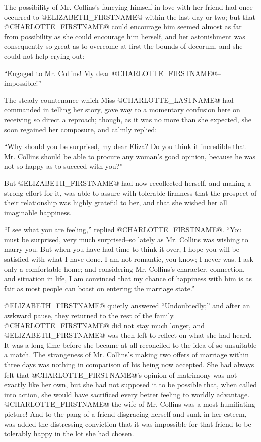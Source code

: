 The possibility of Mr. Collins's fancying himself in love with her
friend had once occurred to @ELIZABETH_FIRSTNAME@ within the last day or two; but
that @CHARLOTTE_FIRSTNAME@ could encourage him seemed almost as far from
possibility as she could encourage him herself, and her astonishment was
consequently so great as to overcome at first the bounds of decorum, and
she could not help crying out:

``Engaged to Mr. Collins! My dear @CHARLOTTE_FIRSTNAME@--impossible!''

The steady countenance which Miss @CHARLOTTE_LASTNAME@ had commanded in telling her
story, gave way to a momentary confusion here on receiving so direct a
reproach; though, as it was no more than she expected, she soon regained
her composure, and calmly replied:

``Why should you be surprised, my dear Eliza? Do you think it incredible
that Mr. Collins should be able to procure any woman's good opinion,
because he was not so happy as to succeed with you?''

But @ELIZABETH_FIRSTNAME@ had now recollected herself, and making a strong effort
for it, was able to assure with tolerable firmness that the prospect of
their relationship was highly grateful to her, and that she wished her
all imaginable happiness.

``I see what you are feeling,'' replied @CHARLOTTE_FIRSTNAME@. ``You must be surprised,
very much surprised--so lately as Mr. Collins was wishing to marry
you. But when you have had time to think it over, I hope you will be
satisfied with what I have done. I am not romantic, you know; I never
was. I ask only a comfortable home; and considering Mr. Collins's
character, connection, and situation in life, I am convinced that my
chance of happiness with him is as fair as most people can boast on
entering the marriage state.''

@ELIZABETH_FIRSTNAME@ quietly answered ``Undoubtedly;'' and after an awkward pause,
they returned to the rest of the family. @CHARLOTTE_FIRSTNAME@ did not stay much
longer, and @ELIZABETH_FIRSTNAME@ was then left to reflect on what she had heard.
It was a long time before she became at all reconciled to the idea of so
unsuitable a match. The strangeness of Mr. Collins's making two offers
of marriage within three days was nothing in comparison of his being now
accepted. She had always felt that @CHARLOTTE_FIRSTNAME@'s opinion of matrimony was
not exactly like her own, but she had not supposed it to be possible
that, when called into action, she would have sacrificed every better
feeling to worldly advantage. @CHARLOTTE_FIRSTNAME@ the wife of Mr. Collins was a
most humiliating picture! And to the pang of a friend disgracing herself
and sunk in her esteem, was added the distressing conviction that it
was impossible for that friend to be tolerably happy in the lot she had
chosen.



